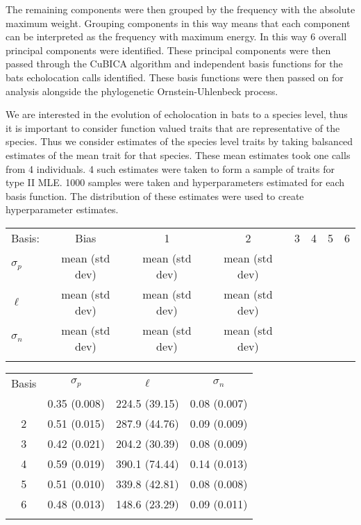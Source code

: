 \documentclass[wsdraft]{ws-rv9x6} %
\begin{document}
The remaining components were then grouped by the frequency with the absolute maximum weight. Grouping components in this way means that each component can be interpreted as the frequency with maximum energy.
In this way 6 overall principal components were identified. These principal components were then passed through the CuBICA algorithm and independent basis functions for the bats echolocation calls identified. These basis functions were then passed on for analysis alongside the phylogenetic Ornstein-Uhlenbeck process.

We are interested in the evolution of echolocation in bats to a species level, thus it is important to consider function valued traits that are representative of the species. Thus we consider estimates of the species level traits by taking balsanced estimates of the mean trait for that species. These mean estimates took one calls from 4 individuals. 4 such estimates were taken to form a sample of traits for type II MLE. 1000 samples were taken and hyperparameters estimated for each basis function. The distribution of these estimates were used to create hyperparameter estimates.

\begin{table}[ht]
	{
		\begin{tabular}{@{}lccccccc@{}} \toprule
			Basis: & Bias & 1 & 2 & 3 & 4 & 5 & 6 \\ 
			\colrule
			\(\sigma_p \)  & mean (std dev) & mean (std dev) & mean (std dev) &&&&  \\
			\(\ell\)  & mean (std dev) & mean (std dev) & mean (std dev) &&&& \\
			\(\sigma_n\)  & mean (std dev) & mean (std dev) & mean (std dev) &&&&  \\
			
			\botrule
		\end{tabular}
	}
	\label{tab::bat_results}
\end{table}

\begin{table}[ht]
	{
		\begin{tabular}{@{}cccc@{}} \toprule
			Basis & \(\sigma_p\) & \(\ell\) & \(\sigma_n\) \\
			\colrule
			1 & 0.35 (0.008) & 224.5 (39.15) & 0.08 (0.007) \\
			2 & 0.51 (0.015) & 287.9 (44.76) & 0.09 (0.009) \\
			3 & 0.42 (0.021)& 204.2 (30.39) & 0.08 (0.009) \\
			4 & 0.59 (0.019) & 390.1 (74.44) & 0.14 (0.013) \\
			5 & 0.51 (0.010) & 339.8 (42.81) & 0.08 (0.008) \\
			6 & 0.48 (0.013) & 148.6 (23.29) & 0.09 (0.011) \\
			\botrule
		\end{tabular}
	}
	\label{tab::bat_results_option2}
\end{table}
\end{document}
